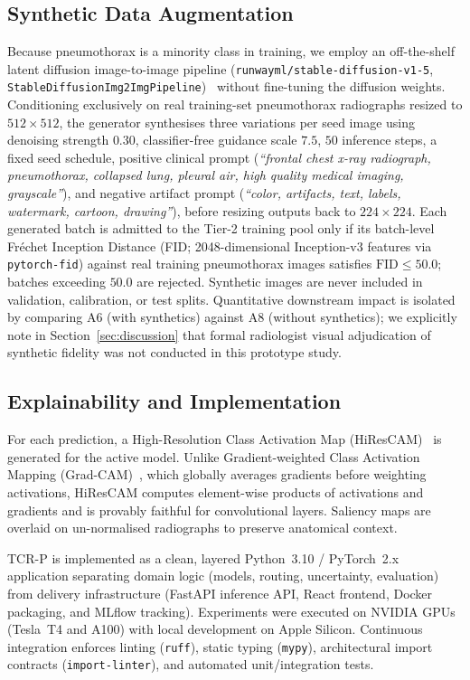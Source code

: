 \documentclass[diagnostics,article,submit,moreauthors]{Definitions/mdpi}
\newcommand{\rev}[1]{#1}
\begin{document}
\subsection{Synthetic Data Augmentation}

Because pneumothorax is a minority class in training, we employ an off-the-shelf latent diffusion image-to-image pipeline (\texttt{runwayml/stable-diffusion-v1-5}, \texttt{StableDiffusionImg2ImgPipeline})~\cite{rombach2022high} \rev{without fine-tuning the diffusion weights. Conditioning exclusively on real training-set pneumothorax radiographs resized to $512\times 512$, the generator synthesises three variations per seed image using denoising strength $0.30$, classifier-free guidance scale $7.5$, $50$ inference steps, a fixed seed schedule, positive clinical prompt (\emph{``frontal chest x-ray radiograph, pneumothorax, collapsed lung, pleural air, high quality medical imaging, grayscale''}), and negative artifact prompt (\emph{``color, artifacts, text, labels, watermark, cartoon, drawing''}), before resizing outputs back to $224\times 224$. Each generated batch is admitted to the Tier-2 training pool only if its batch-level Fr\'echet Inception Distance (FID; 2048-dimensional Inception-v3 features via \texttt{pytorch-fid}) against real training pneumothorax images satisfies $\mathrm{FID} \le 50.0$; batches exceeding $50.0$ are rejected. Synthetic images are never included in validation, calibration, or test splits. Quantitative downstream impact is isolated by comparing A6 (with synthetics) against A8 (without synthetics); we explicitly note in Section~\ref{sec:discussion} that formal radiologist visual adjudication of synthetic fidelity was not conducted in this prototype study.}

\subsection{Explainability and Implementation}

For each prediction, a High-Resolution Class Activation Map (HiResCAM)~\cite{draelos2020hirescam} is generated for the active model. Unlike Gradient-weighted Class Activation Mapping (Grad-CAM)~\cite{selvaraju2017gradcam}, which globally averages gradients before weighting activations, HiResCAM computes element-wise products of activations and gradients and is provably faithful for convolutional layers. Saliency maps are overlaid on un-normalised radiographs to preserve anatomical context.

TCR-P is implemented as a clean, layered Python~3.10 / PyTorch~2.x application separating domain logic (models, routing, uncertainty, evaluation) from delivery infrastructure (FastAPI inference API, React frontend, Docker packaging, and MLflow tracking). Experiments were executed on NVIDIA GPUs (Tesla~T4 and A100) with local development on Apple Silicon. Continuous integration enforces linting (\texttt{ruff}), static typing (\texttt{mypy}), architectural import contracts (\texttt{import-linter}), and automated unit/integration tests.
\end{document}
